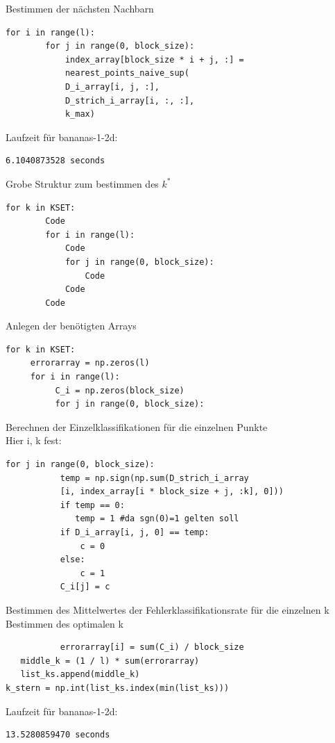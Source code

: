 \documentclass{beamer}
\begin{document}
\begin{frame}[fragile]
Bestimmen der nächsten Nachbarn
\begin{verbatim}
for i in range(l):
        for j in range(0, block_size):
            index_array[block_size * i + j, :] =
            nearest_points_naive_sup(
            D_i_array[i, j, :],
            D_strich_i_array[i, :, :], 
            k_max)
\end{verbatim}
Laufzeit für bananas-1-2d:
\begin{verbatim}
6.1040873528 seconds
\end{verbatim}
\end{frame}

\begin{frame}[fragile]
Grobe Struktur zum bestimmen des $k^*$
\begin{verbatim}
for k in KSET:
        Code
        for i in range(l):
            Code
            for j in range(0, block_size):
                Code
            Code
        Code
\end{verbatim}
\end{frame}

\begin{frame}[fragile]
Anlegen der benötigten Arrays
\begin{verbatim}
for k in KSET:
     errorarray = np.zeros(l)
     for i in range(l):
          C_i = np.zeros(block_size)
          for j in range(0, block_size):
\end{verbatim}
\end{frame}

\begin{frame}[fragile]
Berechnen der Einzelklassifikationen für die einzelnen Punkte\\
Hier i, k fest:
\begin{verbatim}
for j in range(0, block_size):
           temp = np.sign(np.sum(D_strich_i_array
           [i, index_array[i * block_size + j, :k], 0]))
           if temp == 0:
              temp = 1 #da sgn(0)=1 gelten soll
           if D_i_array[i, j, 0] == temp:
               c = 0
           else:
               c = 1
           C_i[j] = c
\end{verbatim}
\end{frame}


\begin{frame}[fragile]
Bestimmen des Mittelwertes der Fehlerklassifikationsrate für die einzelnen k\\
Bestimmen des optimalen k
\begin{verbatim}    	   errorarray[i] = sum(C_i) / block_size
   middle_k = (1 / l) * sum(errorarray)
   list_ks.append(middle_k)
k_stern = np.int(list_ks.index(min(list_ks)))
\end{verbatim}
Laufzeit für bananas-1-2d:
\begin{verbatim}
13.5280859470 seconds
\end{verbatim}
\end{frame}
\end{document}
